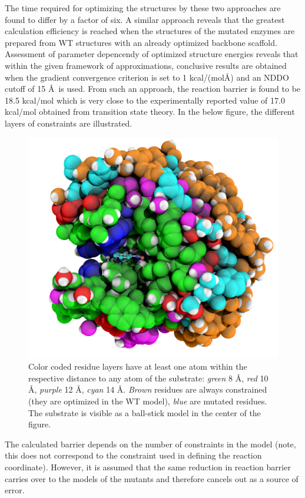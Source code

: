 The time required for optimizing the structures by these two approaches are found to differ by a factor of six.
A similar approach reveals that the greatest calculation efficiency is reached when the structures of the mutated enzymes are prepared from WT structures with an already optimized backbone scaffold.\\
Assessment of parameter depencendy of optimized structure energies reveals that within the given framework of approximations, conclusive results are obtained when the gradient convergence criterion is set to 1 kcal/(mol\AA) and an NDDO cutoff of 15 \AA \mbox{ i}s used.
From such an approach, the reaction barrier is found to be 18.5 kcal/mol which is very close to the experimentally reported value of 17.0 kcal/mol obtained from transition state theory\cite{joshi2000hydrogen}.
In the below figure, the different layers of constraints are illustrated.
\begin{figure}[htbp] 
\centering
\includegraphics[width=1.0\linewidth]{bcx-constraint-layers-ray-occlusion.png}
\caption{
Color coded residue layers have at least one atom within the respective distance to any atom of the substrate:
\textit{green} 8 \AA, \textit{red} 10 \AA, \textit{purple} 12 \AA, \textit{cyan} 14 \AA.
\textit{Brown} residues are always constrained (they are optimized in the WT model), \textit{blue} are mutated residues.
The substrate is visible as a ball-stick model in the center of the figure.
}
\label{fig:bcx_constr_constraint_layers}
\end{figure}
The calculated barrier depends on the number of constraints in the model (note, this does not correspond to the constraint used in defining the reaction coordinate).
However, it is assumed that the same reduction in reaction barrier carries over to the models of the mutants and therefore cancels out as a source of error.



